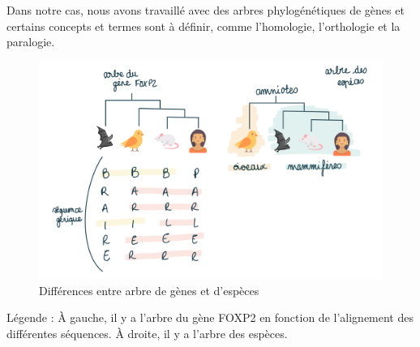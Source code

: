\par Dans notre cas, nous avons travaillé avec des arbres phylogénétiques de gènes et certains concepts et termes sont à définir, comme l’homologie, l’orthologie et la paralogie.

\begin{figure}[H]
    \centering
    \includegraphics[width=1\textwidth]{figures/corps/figure5.png}
    \caption{Différences entre arbre de gènes et d'espèces}
    \label{fig:5_foxp2}
\end{figure}
Légende : À gauche, il y a l’arbre du gène FOXP2 en fonction de l’alignement des différentes séquences. À droite, il y a l’arbre des espèces. \newpage

